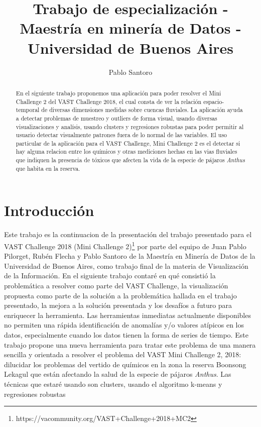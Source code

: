 \documentclass[a4paper, twopager]{article}
\author{Pablo Santoro}
\title{Trabajo de especialización - Maestría en minería de Datos - Universidad de Buenos Aires}
\begin{document}
\maketitle
\begin{abstract}
En el siguiente trabajo proponemos una aplicación para poder resolver el Mini Challenge 2 del VAST Challenge 2018, el cual consta de ver la relación espacio-temporal de diversas dimensiones medidas sobre cuencas fluviales. La aplicación ayuda a detectar problemas de muestreo y outliers de forma visual, usando diversas visualizaciones y analísis, usando clusters y regresiones robustas para poder permitir al usuario detectar visualmente patrones fuera de lo normal de las variables. El uso particular de la aplicación para el VAST Challenge, Mini Challenge 2 es el detectar si hay alguna relacion entre los químicos y otras mediciones hechas en las vias fluviales que indiquen la presencia de tóxicos que afecten la vida de la especie de pájaros \emph{Anthus} que habita en la reserva.
\end{abstract}
\newpage
\tableofcontents
\newpage
\section{Introducción}
Este trabajo es la continuacion de la presentación del trabajo presentado para el VAST Challenge 2018 (Mini Challenge 2)\footnote{https://vacommunity.org/VAST+Challenge+2018+MC2} por parte del equipo de Juan Pablo Pilorget, Rubén Flecha y Pablo Santoro de la Maestría en Minería de Datos de la Universidad de Buenos Aires, como trabajo final de la materia de Visualización de la Información. 
En el siguiente trabajo contaré en qué consistió la problemática a resolver como parte del VAST Challenge, la visualización propuesta como parte de la solución a la problemática hallada en el trabajo presentado, la mejora a la solución presentada y los desafíos a futuro para enriquecer la herramienta.
Las herramientas inmediatas actualmente disponibles no permiten una rápida identificación de anomalías y/o valores atípicos en los datos, especialmente cuando los datos tienen la forma de series de tiempo. Este trabajo propone una nueva herramienta para tratar este problema de una manera sencilla y orientada a resolver el problema del VAST Mini Challenge 2, 2018: dilucidar los problemas del vertido de químicos en la zona la reserva Boonsong Lekagul que están afectando la salud de la especie de pájaros \emph{Anthus}.
Las técnicas que estaré usando son clusters, usando el algoritmo k-means y regresiones robustas
\end{document}
